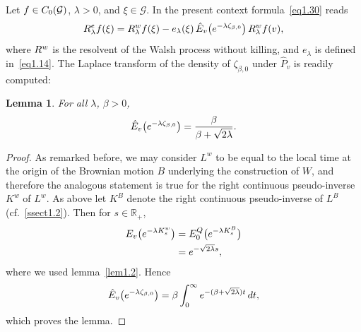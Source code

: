 \documentclass[11pt,a4paper]{amsart}
\newcommand{\gb}{\beta}
\newcommand{\gl}{\lambda}
\newcommand{\cG}{\mathcal{G}}
\newcommand{\1}{1}
\newcommand{\R}{\mathbb{R}}
\newtheorem{lemma}[theorem]{Lemma}
\theoremstyle{remark}
\newcommand{\sgl}{\ensuremath\sqrt{2\gl}}
\newcommand{\Co}{\ensuremath C_0(\cG)}
\newcommand{\RW}{\ensuremath R^w}
\newcommand{\hP}{\ensuremath{\hat P}}
\newcommand{\hE}{\ensuremath{\hat E}}
\numberwithin{equation}{section}
\begin{document}
Let $f\in\Co$, $\gl>0$, and $\xi\in\cG$. In the present context
formula~\eqref{eq1.30} reads
\begin{equation*}
    R^e_\gl f(\xi)
        = \RW_\gl f(\xi) - e_\gl(\xi)\,\hE_v\bigl(e^{-\gl \zeta_{\gb,0}}\bigr)\, \RW_\gl f(v),
\end{equation*}
where $\RW$ is the resolvent of the Walsh process without killing, and $e_\gl$ is
defined in~\eqref{eq1.14}. The Laplace transform of the density of $\zeta_{\gb,0}$ under
$\hP_v$ is readily computed:

\begin{lemma}   \label{lem3.3}
For all $\gl$, $\gb>0$,
\begin{equation*}
    \hE_v\bigl(e^{-\gl \zeta_{\gb,0}}\bigr) = \frac{\gb}{\gb + \sgl}.
\end{equation*}
\end{lemma}

\begin{proof}
As remarked before, we may consider $L^w$ to be equal to the local time at the
origin of the Brownian motion $B$ underlying the construction of $W$, and therefore
the analogous statement is true for the right continuous pseudo-inverse $K^w$ of $L^w$.
As above let $K^B$ denote the right continuous pseudo-inverse of $L^B$ (cf.~\ref{ssect1.2}).
Then for $s\in\R_+$,
\begin{align*}
    E_v\bigl(e^{-\gl K^w_s}\bigr)
        &= E^Q_0\bigl(e^{-\gl K^B_s}\bigr)\\
        &= e^{-\sgl s},
\end{align*}
where we used lemma~\ref{lem1.2}. Hence
\begin{equation*}
    \hE_v\bigl(e^{-\gl \zeta_{\gb,0}}\bigr)
        = \gb \int_0^\infty e^{-(\gb+\sgl) t}\,dt,
\end{equation*}
which proves the lemma.
\end{proof}
\end{document}
